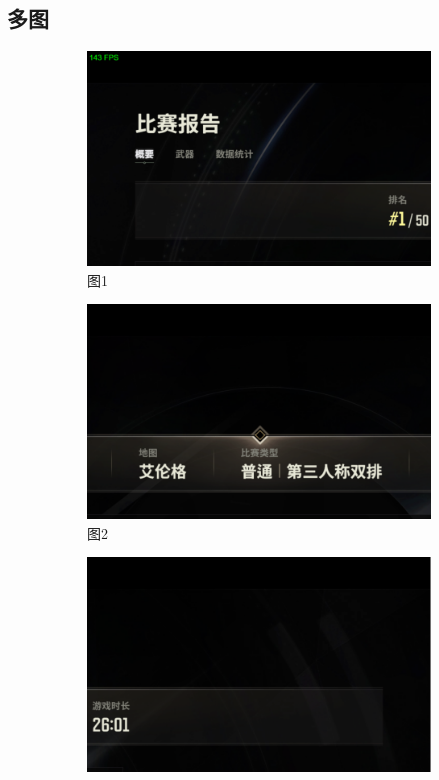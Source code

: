 \documentclass[12pt, a4paper, oneside]{ctexart}
\begin{document}
\subsection{多图}

\begin{figure}[htbp]
    \centering
    \begin{subfigure}{0.3\textwidth}
        \centering
        \includegraphics[width=\textwidth]{fig/1.png} %
        \caption{图1}
    \end{subfigure}
    \hfill
    \begin{subfigure}{0.3\textwidth}
        \centering
        \includegraphics[width=\textwidth]{fig/2.png} %
        \caption{图2}
    \end{subfigure}
    \hfill
    \begin{subfigure}{0.3\textwidth}
        \centering
        \includegraphics[width=\textwidth]{fig/3.png} %

\end{subfigure}
\end{figure}
\end{document}
